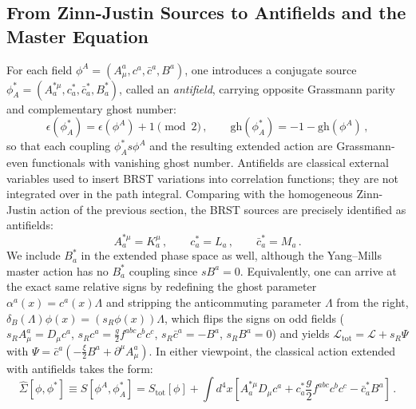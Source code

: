 \subsection{From Zinn-Justin Sources to Antifields and the Master Equation}

For each field \(\phi^A = (A_\mu^a, c^a, \bar{c}^a, B^a)\), one introduces a conjugate source \(\phi_A^* = (A_a^{*\mu}, c_a^*, \bar{c}_a^*, B_a^*)\), called an \textit{antifield}, carrying opposite Grassmann parity and complementary ghost number:
\begin{equation} \label{eq:antifield_parity_gh}
    \epsilon(\phi_A^*) = \epsilon(\phi^A) + 1 \pmod 2 \, , \qquad \text{gh}(\phi_A^*) = -1 - \text{gh}(\phi^A) \, ,
\end{equation}
so that each coupling \(\phi_A^* s\phi^A\) and the resulting extended action are Grassmann-even functionals with vanishing ghost number. Antifields are classical external variables used to insert BRST variations into correlation functions; they are not integrated over in the path integral. Comparing with the homogeneous Zinn-Justin action of the previous section, the BRST sources are precisely identified as antifields:
\begin{equation} \label{eq:zj_sources_as_antifields}
    A_a^{*\mu} = K_a^\mu \, , \qquad c_a^* = L_a \, , \qquad \bar{c}_a^* = M_a \, .
\end{equation}
We include \(B_a^*\) in the extended phase space as well, although the Yang--Mills master action has no \(B_a^*\) coupling since \(sB^a = 0\). Equivalently, one can arrive at the exact same relative signs by redefining the ghost parameter \(\alpha^a(x) = c^a(x)\Lambda\) and stripping the anticommuting parameter \(\Lambda\) from the right, \(\delta_B(\Lambda)\phi(x) = (s_R\phi(x))\Lambda\), which flips the signs on odd fields (\(s_R A_\mu^a = D_\mu c^a\), \(s_R c^a = \frac{g}{2}f^{abc}c^b c^c\), \(s_R \bar{c}^a = -B^a\), \(s_R B^a = 0\)) and yields \(\mathcal{L}_{\text{tot}} = \mathcal{L} + s_R\Psi\) with \(\Psi = \bar{c}^a(-\frac{\xi}{2}B^a + \partial^\mu A_\mu^a)\). In either viewpoint, the classical action extended with antifields takes the form:
\begin{equation} \label{eq:bv_ym_extended_action}
    \widehat{\Sigma}[\phi, \phi^*] \equiv S[\phi^A, \phi_A^*] = S_{\text{tot}}[\phi] + \int d^4x \left[ A_a^{*\mu} D_\mu c^a + c_a^* \frac{g}{2} f^{abc} c^b c^c - \bar{c}_a^* B^a \right] \, .
\end{equation}

